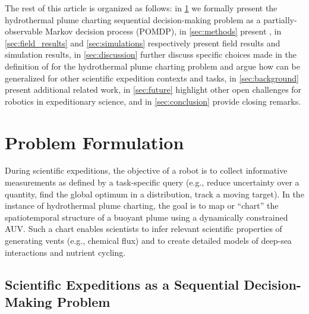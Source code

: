 The rest of this article is organized as follows: in \cref{sec:problem} we formally present the hydrothermal plume charting sequential decision-making problem as a partially-observable Markov decision process (POMDP), in \cref{sec:methods} present \PHORTEX, in \cref{sec:field_results} and \cref{sec:simulations} respectively present field results and simulation results, in \cref{sec:discussion} further discuss specific choices made in the definition of \PHORTEX for the hydrothermal plume charting problem and argue how \PHORTEX can be generalized for other scientific expedition contexts and tasks, in \cref{sec:background} present additional related work, in \cref{sec:future} highlight other open challenges for robotics in expeditionary science, and in \cref{sec:conclusion} provide closing remarks. 



\section{Problem Formulation}
\label{sec:problem}
During scientific expeditions, the objective of a robot is to collect informative measurements as defined by a task-specific query (e.g., reduce uncertainty over a quantity, find the global optimum in a distribution, track a moving target). In the instance of hydrothermal plume charting, the goal is to map or ``chart'' the spatiotemporal structure of a buoyant plume using a dynamically constrained AUV. Such a chart enables scientists to infer relevant scientific properties of generating vents (e.g., chemical flux) and to create detailed models of deep-sea interactions and nutrient cycling. 

\subsection{Scientific Expeditions as a Sequential Decision-Making Problem}

